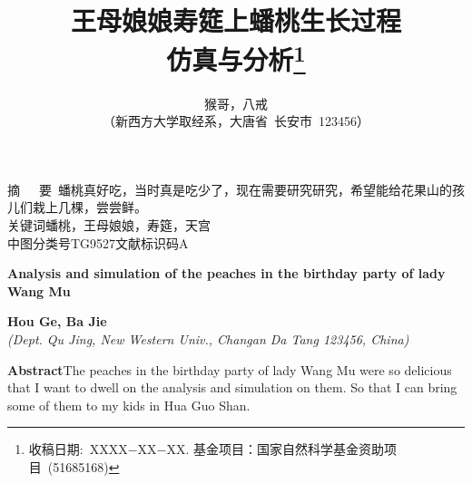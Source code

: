 \documentclass[a4paper,11pt,onecolumn,twoside]{article}
\title{\huge{王母娘娘寿筵上蟠桃生长过程\\
仿真与分析}\thanks{收稿日期:~XXXX$-$XX$-$XX. 基金项目：国家自然科学基金资助项目~(51685168)}}
\author{猴哥，八戒\\[2pt]
\normalsize
（新西方大学取经系，大唐省~长安市~123456） \\[2pt]}
\date{}  %
\begin{document}
\begin{CJK*}{GBK}{song}
\newcommand{\supercite}[1]{\textsuperscript{\cite{#1}}}
\maketitle

\setlength{\oddsidemargin}{ 1cm}  %
\setlength{\evensidemargin}{\oddsidemargin}
\setlength{\textwidth}{13.50cm}
\vspace{-.8cm}
\begin{center}
\parbox{\textwidth}{
摘~~~要\quad {}~蟠桃真好吃，当时真是吃少了，现在需要研究研究，希望能给花果山的孩儿们栽上几棵，尝尝鲜。\\
关键词\quad{}蟠桃，王母娘娘，寿筵，天宫\\
中图分类号\quad TG9527\qquad  {}文献标识码\quad A}
\end{center}
\vspace{.1cm}
\begin{center}
\parbox{\textwidth}{
{\large{\textbf{Analysis and simulation of the peaches in the birthday party of lady Wang Mu}}}\\
\vspace{-0.5cm}
\begin{center}
\textbf{Hou Ge, Ba Jie}\\[2pt]
\small{\textit{(Dept. Qu Jing, New Western Univ., Changan Da Tang 123456, China)}}\\[2pt]
\end{center}
{\small{\textbf{Abstract}\quad The peaches in the birthday party of lady Wang Mu were so delicious that I want to dwell on the analysis and simulation on them. So that I can bring some of them to my kids in Hua Guo Shan.\\
}}}
\end{center}
\end{CJK*}
\end{document}
